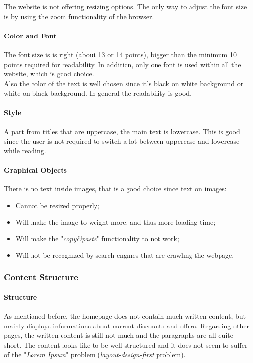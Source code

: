 The website is not offering resizing options. The only way to adjust the font size is by using the zoom functionality of the browser. 

\paragraph{Color and Font}
The font size is is right (about 13 or 14 points), bigger than the minimum 10 points required for readability. 
In addition, only one font is used within all the website, which is good choice.\\
Also the color of the text is well chosen since it's black on white background or white on black background. 
In general the readability is good.

\paragraph{Style}
A part from titles that are uppercase, the main text is lowercase. 
This is good since the user is not required to switch a lot between uppercase and lowercase while reading. 

\paragraph{Graphical Objects}
There is no text inside images, that is a good choice since text on images:
\begin{itemize}
\item Cannot be resized properly;
\item Will make the image to weight more, and thus more loading time;
\item Will make the "\textit{copy\&paste}" functionality to not work;
\item Will not be recognized by search engines that are crawling the webpage.
\end{itemize}


\subsubsection{Content Structure}
\paragraph{Structure}
As mentioned before, the homepage does not contain much written content, but mainly displays informations about current discounts
and offers.
Regarding other pages, the written content is still not much and the paragraphs are all quite short. 
The content looks like to be well structured and it does not seem to suffer of the "\textit{Lorem Ipsum}" 
problem (\textit{layout-design-first} problem). \\

